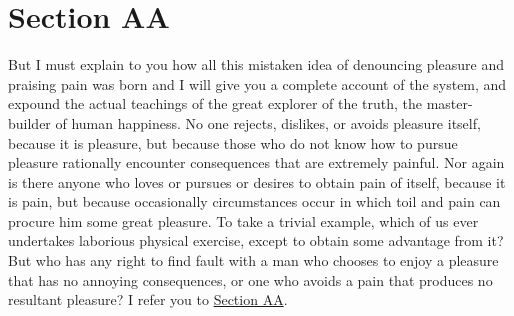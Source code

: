 \hypertarget{_section_aa}{\section*{Section AA}}
But I must explain to you how all this mistaken
idea of denouncing pleasure and praising pain
was born and I will give you a complete account
of the system, and expound the actual teachings
of the great explorer of the truth, the
master-builder of human happiness. No one
rejects, dislikes, or avoids pleasure itself,
because it is pleasure, but because those who
do not know how to pursue pleasure rationally
encounter consequences that are extremely
painful. Nor again is there anyone who loves
or pursues or desires to obtain pain of itself,
because it is pain, but because occasionally
circumstances occur in which toil and pain can
procure him some great pleasure. To take a trivial
example, which of us ever undertakes laborious
physical exercise, except to obtain some
advantage from it? But who has any right
to find fault with a man who chooses to
enjoy a pleasure that has no
annoying consequences, or one who avoids
a pain that produces no resultant pleasure?
I refer you to \hyperlink{_section_aa}{Section AA}.
